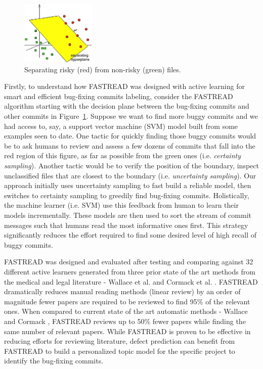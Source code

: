 \documentclass[10pt,conference]{IEEEtran}
\newcommand{\fig}[1]{Figure~\ref{fig:#1}}
\begin{document}
\begin{figure}
\vspace{-10pt}
\hspace{-12pt}
\includegraphics[width=1.4in]{svm.png}
\vspace{-5pt} \hspace{-25pt} \caption{ Separating risky (red) from  non-risky (green) files.}\label{fig:svm}
\vspace{-15pt}
\end{figure}  Firstly, to understand how FASTREAD was designed with active learning for smart and efficient bug-fixing commits labeling, consider the FASTREAD algorithm \cite{Yu2018} starting with the decision plane between the bug-fixing commits and other commits in \fig{svm}. Suppose we want to find more buggy commits and we had access to, say, a support vector machine (SVM) model built from some examples seen to date. 
One tactic for quickly finding those buggy commits would be to ask humans to review and assess a few dozens of commits that fall into the red region of this figure, as far as possible from the green ones (i.e. {\em certainty sampling}). Another tactic would be to verify the position of the boundary, inspect unclassified files that are closest to the boundary (i.e. {\em uncertainty sampling}). Our approach initially uses uncertainty sampling to fast build a reliable model, then switches to certainty sampling to greedily find bug-fixing commits. Holistically,  the machine learner (i.e. SVM) use this feedback from human to learn their models incrementally. These models are then used to sort the stream of commit messages such that humans read the most informative ones first. This strategy significantly reduces the effort required to find some desired level of high recall of buggy commits.

FASTREAD was designed and evaluated after testing and comparing against 32 different active learners generated from three prior state of the art methods from the medical and legal literature - Wallace et al. and Cormack et al. \cite{wallace2010active, Cormack2015Autonomy}. FASTREAD dramatically reduces manual reading methods (linear review) by an order of magnitude fewer papers are required to be reviewed to find 95\% of the relevant ones. When compared to current state of the art automatic methods - Wallace and Cormack \cite{wallace2010active, Cormack2015Autonomy}, FASTREAD reviews up to 50\% fewer papers while finding the same number of relevant papers. While FASTREAD is proven to be effective in reducing efforts for reviewing literature, defect prediction can benefit from FASTREAD to build a personalized topic model for the specific project to identify the bug-fixing commits.  
\end{document}
